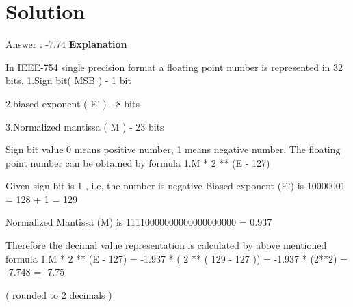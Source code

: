 \documentclass[journal,12pt,twocolumn]{IEEEtran}
\begin{document}
\section{Solution}
Answer : -7.74
\newline
\newline
\textbf{Explanation}
\newline
\newline

In IEEE-754 single precision format a floating point number is represented in 32 bits.
\newline
\newline
1.Sign bit( MSB ) - 1 bit
\newline

2.biased exponent ( E' ) - 8 bits
\newline

3.Normalized mantissa ( M ) - 23 bits
\newline

Sign bit value 0 means positive number, 1 means negative number.
\newline
\newline
The floating point number can be obtained by formula \pm 1.M * 2 ** (E - 127)
\newline
\newline
\nextpage

Given sign bit is 1 , i.e, the number is negative
\newline
\newline
Biased exponent (E')  is  10000001 =  128 + 1 = 129
\newline

Normalized Mantissa (M) is 11110000000000000000000  =  0.937 
\newline
\newline

Therefore the decimal value representation is calculated by above mentioned formula  
\newline
\newline
\pm 1.M * 2 ** (E - 127)  = -1.937 * ( 2 ** ( 129 - 127 )) =  -1.937 * (2**2) = -7.748 = -7.75

( rounded to 2 decimals ) 

  
\end{document}
